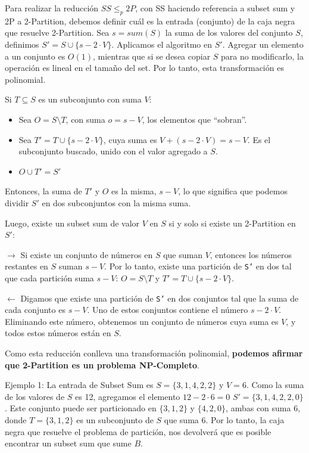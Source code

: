 \documentclass{article}
\begin{document}
Para realizar la reducción $SS \leq_p 2P$, con SS haciendo referencia a subset sum y 2P a 2-Partition, debemos definir cuál es la entrada (conjunto) de la caja negra que resuelve 2-Partition. Sea $s = sum(S)$ la suma de los valores del conjunto $S$, definimos \( S' = S \cup \{s - 2\cdot V\} \). Aplicamos el algoritmo en $S'$. Agregar un elemento a un conjunto es $O(1)$, mientras que si se desea copiar $S$ para no modificarlo, la operación es lineal en el tamaño del set. Por lo tanto, esta transformación es polinomial.

Si \( T \subseteq S \) es un subconjunto con suma \( V \):

\begin{itemize}
    \item Sea \( O = S \setminus T \), con suma \( o = s - V \), los elementos que ``sobran''.
    \item Sea \( T' = T \cup \{s - 2 \cdot V\} \), cuya suma es \( V + (s - 2 \cdot V) = s - V \). Es el subconjunto buscado, unido con el valor agregado a $S$.
    \item $ O \cup T' = S'$
\end{itemize}

Entonces, la suma de \( T' \) y \( O \) es la misma, \( s - V \), lo que significa que podemos dividir \( S' \) en dos subconjuntos con la misma suma.

Luego, existe un subset sum de valor $V$ en $S$ si y solo si existe un 2-Partition en $S'$:

    $\rightarrow$ Si existe un conjunto de números en $S$ que suman $V$, entonces los números restantes en $S$ suman \(s - V\). Por lo tanto, existe una partición de \texttt{S'} en dos tal que cada partición suma \(s - V\): \( O = S \setminus T \) y \( T' = T \cup \{s - 2 \cdot V\} \). 

    $\leftarrow$ Digamos que existe una partición de \texttt{S'} en dos conjuntos tal que la suma de cada conjunto es \(s - V\). Uno de estos conjuntos contiene el número \(s - 2 \cdot V\). Eliminando este número, obtenemos un conjunto de números cuya suma es $V$, y todos estos números están en $S$.

Como esta reducción conlleva una transformación polinomial, \textbf{podemos afirmar que 2-Partition es un problema NP-Completo}.

Ejemplo 1: La entrada de Subset Sum es \( S = \{3, 1, 4, 2, 2\} \) y \( V = 6 \). Como la suma de los valores de $S$ es 12, agregamos el elemento $12 - 2 \cdot 6 = 0$ \( S' = \{3, 1, 4, 2, 2, 0\} \). Este conjunto puede ser particionado en \( \{3, 1, 2\} \) y \( \{4, 2, 0\} \), ambas con suma 6, donde \( T = \{3, 1, 2\} \) es un subconjunto de \( S \) que suma \( 6 \). Por lo tanto, la caja negra que resuelve el problema de partición, nos devolverá que es posible encontrar un subset sum que sume $B$.
\end{document}
